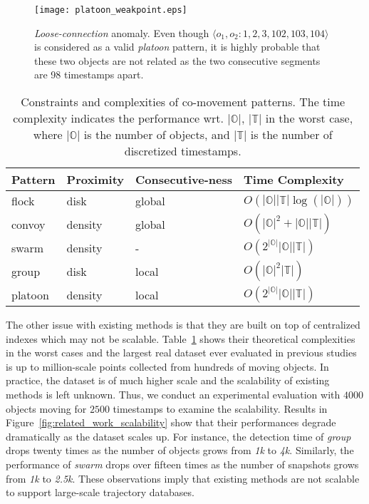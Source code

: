 \begin{figure}[h]
\center
\texttt{[image: platoon\_weakpoint.eps]}
\vspace{-0.5em}
\caption{\emph{Loose-connection} anomaly. Even though $\langle o_1, o_2: 1,2,3,102,103,104 \rangle$ is considered as a valid \emph{platoon} pattern, it is highly probable that these two objects are not related as the two consecutive segments  are 98 timestamps apart. 
}
\vspace{-0.5em}
\label{fig:platoon_weakpoint}
\end{figure}

\begin{table}[t]
\centering
\begin{tabular}{|p{1.5cm}|p{1.5cm}|p{2cm}|p{2.3cm}|}
\hline 
\textbf{Pattern} & {\textbf{Proximity}} & { \textbf{Consecutive-ness}} & { \textbf{Time  Complexity}}\\ 
\hline 
flock~\cite{gudmundsson2004flock} & disk &  global & {$O(|\mathbb{O}||\mathbb{T}|\log(|\mathbb{O}|))$} \\ 
\hline 
convoy~\cite{jeung2008convoy} & density &   global & {$O(|\mathbb{O}|^2+|\mathbb{O}||\mathbb{T}|)$}\\ 
\hline 
swarm~\cite{li2010swarm} & density  & - & {$O(2^{|\mathbb{O}|}|\mathbb{O}||\mathbb{T}|)$}  \\ 
\hline 
group~\cite{wang2006grouppattern} & disk &  local & {$O(|\mathbb{O}|^2|\mathbb{T}|)$}\\ 
\hline 
platoon~\cite{li2015platoon} & density &  local & {$O(2^{|\mathbb{O}|}|\mathbb{O}||\mathbb{T}|)$}\\ 
\hline 
\end{tabular} 
\vspace{-0.5em}
\caption{Constraints and complexities of co-movement patterns. The time complexity indicates the performance wrt.
$|\mathbb{O}|$, $|\mathbb{T}|$ in the worst case, where $|\mathbb{O}|$ is the number of objects, and $|\mathbb{T}|$ is the number of discretized timestamps.}
\vspace{-0.5em}
\label{tbl:existing_co_patterns}
\end{table}

The other issue with existing methods is that they are built on top of centralized indexes which may not be scalable. Table~\ref{tbl:existing_co_patterns} shows their theoretical complexities in the worst cases and the largest real dataset ever evaluated in previous studies is up to million-scale points collected from hundreds of moving objects. In practice, the dataset is of much higher scale and the scalability of existing methods is left unknown. Thus, we conduct an experimental evaluation with $4000$ objects moving for $2500$ timestamps to examine the scalability. Results in Figure~\ref{fig:related_work_scalability} show that their performances degrade dramatically as the dataset scales up. For instance, the detection time of \emph{group} drops twenty times as the number of objects grows from \emph{1k} to \emph{4k}. Similarly,
the performance of \emph{swarm} drops over fifteen times as the number of snapshots grows from \emph{1k} to \emph{2.5k}.
These observations imply that existing methods are not scalable to support large-scale trajectory databases. 

